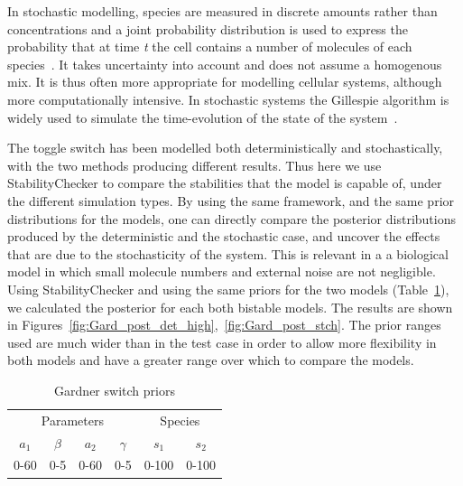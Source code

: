 In stochastic modelling, species are measured in discrete amounts rather than concentrations and a joint probability distribution is used to express the probability that at time \textit{t} the cell contains a number of molecules of each species~\autocite{deJong:2002ft}. It takes uncertainty into account and does not assume a homogenous mix. It is thus often more appropriate for modelling cellular systems, although more computationally intensive. In stochastic systems the Gillespie algorithm is widely used to simulate the time-evolution of the state of the system~\autocite{Warren:2005kea}.

The toggle switch has been modelled both deterministically and stochastically, with the two methods producing different results. Thus here we use StabilityChecker to compare the stabilities that the model is capable of, under the different simulation types. By using the same framework, and the same prior distributions for the models, one can directly compare the posterior distributions produced by the deterministic and the stochastic case, and uncover the effects that are due to the stochasticity of the system. This is relevant in a a biological model in which small molecule numbers and external noise are not negligible. Using StabilityChecker and using the same priors for the two models (Table~\ref{tab:gard_det_stoch}), we calculated the posterior for each both bistable models. The results are shown in Figures~\ref{fig:Gard_post_det_high},~\ref{fig:Gard_post_stch}. The prior ranges used are much wider than in the test case in order to allow more flexibility in both models and have a greater range over which to compare the models. 

\clearpage
\begin{table}[p]
\centering
\caption{Gardner switch priors}
\label{tab:gard_det_stoch}
\begin{tabular}{cccc|cc}
\multicolumn{4}{c|}{Parameters} & \multicolumn{2}{c}{Species} \\ %
$a_1$   & $\beta$   & $a_2$   & $\gamma$  &   $s_1$      &       $s_2$   \\
0-60    & 0-5       & 0-60    &  0-5      &      0-100   &          0-100   
\end{tabular}
\end{table}


